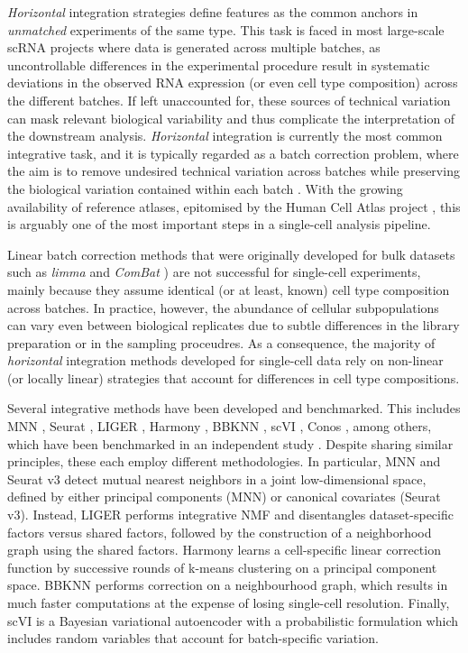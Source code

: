 \textit{Horizontal} integration strategies define features as the common anchors in \textit{unmatched} experiments of the same type. This task is faced in most large-scale scRNA projects where data is generated across multiple batches, as uncontrollable differences in the experimental procedure result in systematic deviations in the observed RNA expression (or even cell type composition) across the different batches. If left unaccounted for, these sources of technical variation can mask relevant biological variability and thus complicate the interpretation of the downstream analysis. \textit{Horizontal} integration is currently the most common integrative task, and it is typically regarded as a batch correction problem, where the aim is to remove undesired technical variation across batches while preserving the biological variation contained within each batch \cite{Tran2020}. With the growing availability of reference atlases, epitomised by the Human Cell Atlas project \cite{Aviv2017}, this is arguably one of the most important steps in a single-cell analysis pipeline. 

Linear batch correction methods that were originally developed for bulk datasets such as \textit{limma} \cite{Ritchie2015b} and \textit{ComBat} \cite{Johnson2006}) are not successful for single-cell experiments, mainly because they assume identical (or at least, known) cell type composition across batches. In practice, however, the abundance of cellular subpopulations can vary even between biological replicates due to subtle differences in the library preparation or in the sampling proceudres. As a consequence, the majority of \textit{horizontal} integration methods developed for single-cell data rely on non-linear (or locally linear) strategies that account for differences in cell type compositions.

Several integrative methods have been developed and benchmarked. This includes MNN \cite{Haghverdi2018}, Seurat \cite{Butler2018}, LIGER \cite{Welch2019}, Harmony \cite{Korsunsky2019}, BBKNN \cite{Polanski2019}, scVI \cite{Lopez2018}, Conos \cite{Barkas2019}, among others, which have been benchmarked in an independent study \cite{Luecken2020}. Despite sharing similar principles, these each employ different methodologies. In particular, MNN and Seurat v3 detect mutual nearest neighbors in a joint low-dimensional space, defined by either principal components (MNN) or canonical covariates (Seurat v3). Instead, LIGER performs integrative NMF and disentangles dataset-specific factors versus shared factors, followed by the construction of a neighborhood graph using the shared factors. Harmony learns a cell-specific linear correction function by successive rounds of k-means clustering on a principal component space. BBKNN performs correction on a neighbourhood graph, which results in much faster computations at the expense of losing single-cell resolution. Finally, scVI is a Bayesian variational autoencoder with a probabilistic formulation which includes random variables that account for batch-specific variation.

